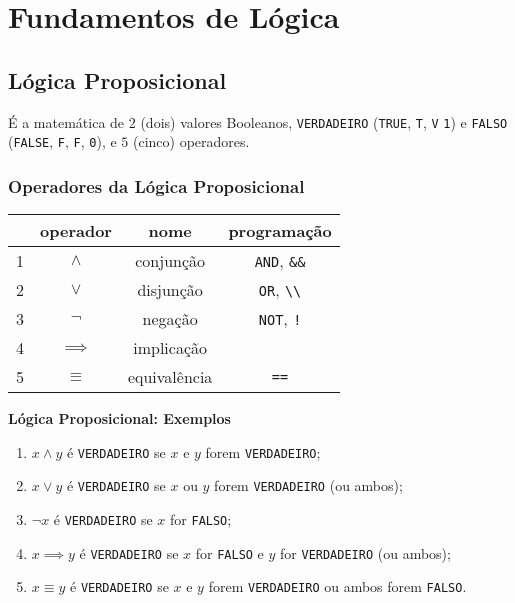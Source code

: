 \def\T{V}
\def\F{F}

\section*{Fundamentos de Lógica}

\subsection*{Lógica Proposicional}

É a matemática de \(2\) (dois) valores Booleanos, \texttt{VERDADEIRO}
(\texttt{TRUE}, \texttt{T}, \texttt{\T} \texttt{1}) e \texttt{FALSO}
(\texttt{FALSE}, \texttt{F}, \texttt{\F}, \texttt{0}), e \(5\) (cinco) operadores.

\subsubsection*{Operadores da Lógica
Proposicional}

\begin{longtable}[]{@{}lccc@{}}\hline
& operador & nome & programação\\\hline
\endhead
1 & \(\land\) & conjunção & \texttt{AND}, \texttt{\&\&}\\
2 & \(\lor\) & disjunção & \texttt{OR},
\texttt{\textbackslash{}\textbar{}\textbackslash{}\textbar{}}\\
3 & \(\lnot\) & negação & \texttt{NOT}, \texttt{!}\\
4 & \(\implies\) & implicação &\\
5 & \(\equiv\) & equivalência & \texttt{==}\\\hline
\end{longtable}

    \textbf{Lógica Proposicional: Exemplos}

\begin{enumerate}
\def\labelenumi{\arabic{enumi}.}
\item
  \(x \land y\) é \texttt{VERDADEIRO} se \(x\) e \(y\) forem
  \texttt{VERDADEIRO};
\item
  \(x \lor y\) é \texttt{VERDADEIRO} se \(x\) ou \(y\) forem
  \texttt{VERDADEIRO} (ou ambos);
\item
  \(\lnot x\) é \texttt{VERDADEIRO} se \(x\) for \texttt{FALSO};
\item
  \(x \implies y\) é \texttt{VERDADEIRO} se \(x\) for \texttt{FALSO} e
  \(y\) for \texttt{VERDADEIRO} (ou ambos);
\item
  \(x\equiv y\) é \texttt{VERDADEIRO} se \(x\) e \(y\) forem
  \texttt{VERDADEIRO} ou ambos forem \texttt{FALSO}.
\end{enumerate}

